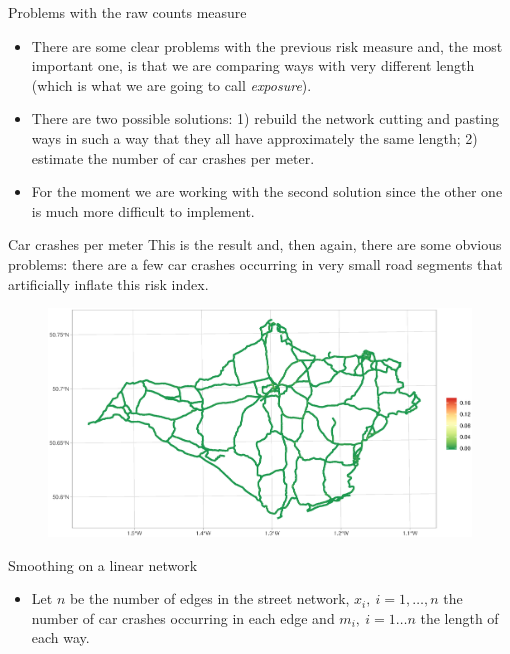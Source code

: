 \documentclass[c,10pt,pdftex]{beamer}
\begin{document}
\begin{frame}{Problems with the raw counts measure}
\begin{itemize}
	\setlength\itemsep{1em}
	\item There are some clear problems with the previous risk measure and, the most important one, is that we are comparing ways with very different length (which is what we are going to call \textit{exposure}). 
	\item There are two possible solutions: 1) rebuild the network cutting and pasting ways in such a way that they all have approximately the same length; 2) estimate the number of car crashes per meter. 
	\item For the moment we are working with the second solution since the other one is much more difficult to implement. 
\end{itemize}
\end{frame}

\begin{frame}{Car crashes per meter}
\vspace{-0.25cm}
This is the result and, then again, there are some obvious problems: there are a few car crashes occurring in very small road segments that artificially inflate this risk index.  
\begin{figure}
	\centering
	\includegraphics[width=\linewidth]{images/car_crashes_per_meter}
\end{figure}
\end{frame}

\begin{frame}{Smoothing on a linear network}
\begin{itemize}
	\setlength\itemsep{1em}
	\item Let $n$ be the number of edges in the street network, $x_i, \ i = 1,\dots,n$ the number of car crashes occurring in each edge and $m_i, \ i = 1\dots n$ the length of each way. 
\end{itemize}
\end{frame}
\end{document}
